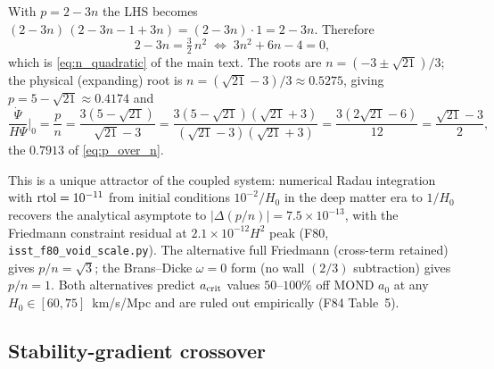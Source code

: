\documentclass[aps,prd,twocolumn,nofootinbib,floatfix,superscriptaddress]{revtex4-2}
\begin{document}
With $p = 2 - 3n$ the LHS becomes
$(2-3n)\,(2-3n-1+3n) = (2-3n)\cdot 1 = 2-3n$.
Therefore
\begin{equation}
\label{eq:powerlaw_quadratic}
2 - 3n = \tfrac{3}{2}\,n^2 \;\Longleftrightarrow\;
3n^2 + 6n - 4 = 0,
\end{equation}
which is \eqref{eq:n_quadratic} of the main text. The roots are
$n = (-3 \pm \sqrt{21})/3$; the physical (expanding) root is
$n = (\sqrt{21}-3)/3 \approx 0.5275$, giving $p = 5 - \sqrt{21}
\approx 0.4174$ and
\begin{equation}
\frac{\dot\Psi}{H\Psi}\bigg|_0 = \frac{p}{n} =
\frac{3(5-\sqrt{21})}{\sqrt{21}-3} =
\frac{3(5-\sqrt{21})(\sqrt{21}+3)}{(\sqrt{21}-3)(\sqrt{21}+3)} =
\frac{3(2\sqrt{21}-6)}{12} = \frac{\sqrt{21}-3}{2},
\end{equation}
the $0.7913$ of \eqref{eq:p_over_n}.

This is a unique attractor of the coupled system: numerical Radau
integration with $\rm rtol = 10^{-11}$ from initial conditions
$10^{-2}/H_0$ in the deep matter era to $1/H_0$ recovers the
analytical asymptote to $|\Delta(p/n)| = 7.5\times 10^{-13}$, with
the Friedmann constraint residual at $2.1\times 10^{-12} H^2$ peak
(F80, \texttt{isst\_f80\_void\_scale.py}). The alternative full
Friedmann (cross-term retained) gives $p/n = \sqrt 3$; the
Brans--Dicke $\omega = 0$ form (no wall $(2/3)$ subtraction) gives
$p/n = 1$. Both alternatives predict $a_{\rm crit}$ values
$50$--$100\%$ off MOND $a_0$ at any $H_0 \in [60, 75]$~km/s/Mpc and
are ruled out empirically (F84 Table~5).

\subsection{Stability-gradient crossover}
\end{document}

